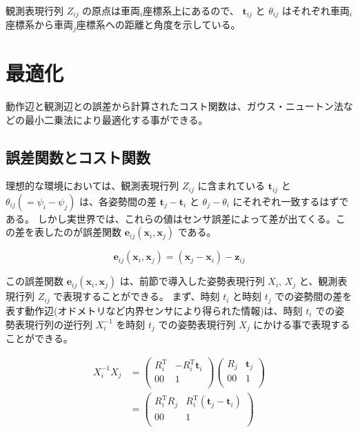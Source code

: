 \documentclass{article}
\begin{document}
観測表現行列 $Z_{ij}$ の原点は車両$_i$座標系上にあるので、 $\bm{t}_{ij}$ と $\theta_{ij}$ はそれぞれ車両$_i$座標系から車両$_j$座標系への距離と角度を示している。

\newpage

\section{最適化} \label{最適化}

動作辺と観測辺との誤差から計算されたコスト関数は、ガウス・ニュートン法などの最小二乗法により最適化する事ができる。

\subsection{誤差関数とコスト関数}

理想的な環境においては、観測表現行列 $Z_{ij}$ に含まれている $\bm{t}_{ij}$ と $\theta_{ij} (= \psi_i - \psi_j)$ は、各姿勢間の差 $\bm{t}_j - \bm{t}_i$ と $\theta_j - \theta_i$ にそれぞれ一致するはずである。
しかし実世界では、これらの値はセンサ誤差によって差が出てくる。この差を表したのが誤差関数 $\bm{e}_{ij}(\bm{x}_i, \bm{x}_j)$ である。

\[
\bm{e}_{ij}(\bm{x}_i, \bm{x}_j) = (\bm{x}_j - \bm{x}_i) - \bm{z}_{ij}
\]

この誤差関数 $\bm{e}_{ij}(\bm{x}_i, \bm{x}_j)$ は、前節で導入した姿勢表現行列 $X_i$, $X_j$ と、観測表現行列 $Z_{ij}$ で表現することができる。
まず、時刻 $t_i$ と時刻 $t_j$ での姿勢間の差を表す動作辺(オドメトリなど内界センサにより得られた情報)は、時刻 $t_i$ での姿勢表現行列の逆行列 $X_i^{-1}$ を時刻 $t_j$ での姿勢表現行列 $X_j$ にかける事で表現することができる。

\[
\begin{align}
X_i^{-1} X_j &=
\left(
  \begin{array}{cc}
    R_i^{\mathrm{T}} & -R_i^{\mathrm{T}}\bm{t}_i \\
                  00 &                           1 \\
  \end{array}
\right)
\left(
  \begin{array}{cc}
    R_j & \bm{t}_j \\
     00 &          1 \\
  \end{array}
\right) \\ &=
\left(
  \begin{array}{cc}
    R_i^{\mathrm{T}}R_j & R_i^{\mathrm{T}}(\bm{t}_j-\bm{t}_i) \\
                     00 &                                       1 \\
  \end{array}
\right)
\end{align}
\]
\end{document}
